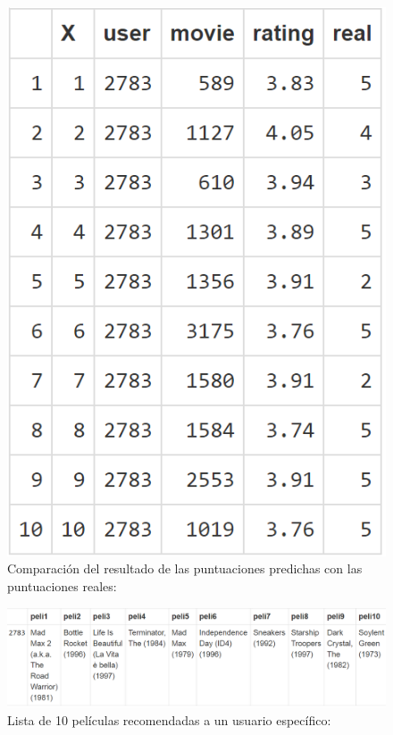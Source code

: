 \documentclass{sciposter}
\begin{document}
\begin{multicols}{3}
\begin{figure}
\begin{center}
 	\includegraphics[scale=0.75]{comparacion}
\end{center}
\caption{ Comparaci\'on del resultado de las puntuaciones predichas con las puntuaciones reales: }\label{fig:comparacion}
\end{figure}



\begin{figure}
\begin{center}

 	\includegraphics[scale=0.75]{recomendar}
\end{center}
\caption{ Lista de 10 pel\'iculas recomendadas a un usuario espec\'ifico: }\label{fig:recomendar}
\end{figure}



\end{multicols}
\end{document}

